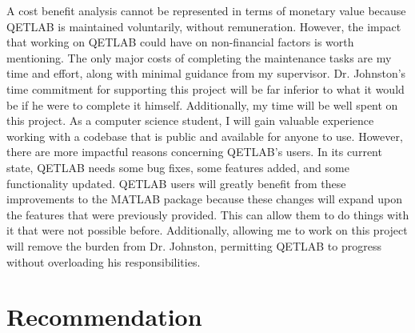 \documentclass[12pt]{article}
\begin{document}
A cost benefit analysis cannot be represented in terms of monetary value because QETLAB is maintained voluntarily, without remuneration. However, the impact that working on QETLAB could have on non-financial factors is worth mentioning. The only major costs of completing the maintenance tasks are my time and effort, along with minimal guidance from my supervisor. Dr. Johnston's time commitment for supporting this project will be far inferior to what it would be if he were to complete it himself. Additionally, my time will be well spent on this project. As a computer science student, I will gain valuable experience working with a codebase that is public and available for anyone to use. However, there are more impactful reasons concerning QETLAB's users. In its current state, QETLAB needs some bug fixes, some features added, and some functionality updated. QETLAB users will greatly benefit from these improvements to the MATLAB package because these changes will expand upon the features that were previously provided. This can allow them to do things with it that were not possible before. Additionally, allowing me to work on this project will remove the burden from Dr. Johnston, permitting QETLAB to progress without overloading his responsibilities.



\section{Recommendation}
\end{document}

